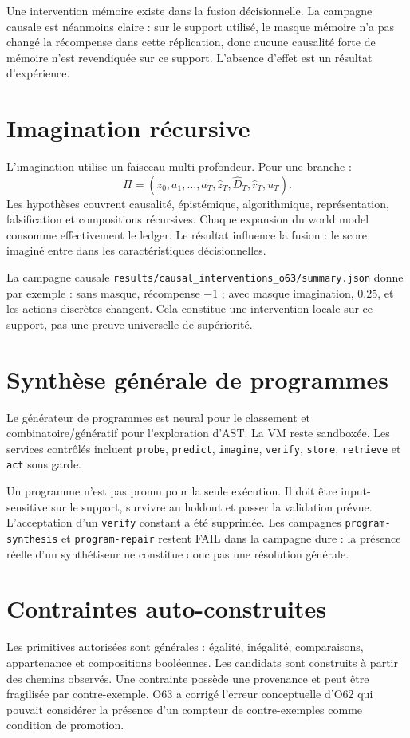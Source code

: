 \documentclass[11pt,a4paper]{article}
\newcommand{\code}[1]{\texttt{#1}}
\begin{document}
Une intervention mémoire existe dans la fusion décisionnelle. La campagne causale est néanmoins claire : sur le support utilisé, le masque mémoire n’a pas changé la récompense dans cette réplication, donc aucune causalité forte de mémoire n’est revendiquée sur ce support. L’absence d’effet est un résultat d’expérience.

\section{Imagination récursive}
L’imagination utilise un faisceau multi-profondeur. Pour une branche :
\[
\Pi=(z_0,a_1,\dots,a_T,\hat z_T,\hat D_T,\hat r_T,u_T).
\]
Les hypothèses couvrent causalité, épistémique, algorithmique, représentation, falsification et compositions récursives. Chaque expansion du world model consomme effectivement le ledger. Le résultat influence la fusion : le score imaginé entre dans les caractéristiques décisionnelles.

La campagne causale \code{results/causal\_interventions\_o63/summary.json} donne par exemple : sans masque, récompense $-1$ ; avec masque imagination, $0.25$, et les actions discrètes changent. Cela constitue une intervention locale sur ce support, pas une preuve universelle de supériorité.

\section{Synthèse générale de programmes}
Le générateur de programmes est neural pour le classement et combinatoire/génératif pour l’exploration d’AST. La VM reste sandboxée. Les services contrôlés incluent \code{probe}, \code{predict}, \code{imagine}, \code{verify}, \code{store}, \code{retrieve} et \code{act} sous garde.

Un programme n’est pas promu pour la seule exécution. Il doit être input-sensitive sur le support, survivre au holdout et passer la validation prévue. L’acceptation d’un \code{verify} constant a été supprimée. Les campagnes \code{program-synthesis} et \code{program-repair} restent FAIL dans la campagne dure : la présence réelle d’un synthétiseur ne constitue donc pas une résolution générale.

\section{Contraintes auto-construites}
Les primitives autorisées sont générales : égalité, inégalité, comparaisons, appartenance et compositions booléennes. Les candidats sont construits à partir des chemins observés. Une contrainte possède une provenance et peut être fragilisée par contre-exemple. O63 a corrigé l’erreur conceptuelle d’O62 qui pouvait considérer la présence d’un compteur de contre-exemples comme condition de promotion.
\end{document}
